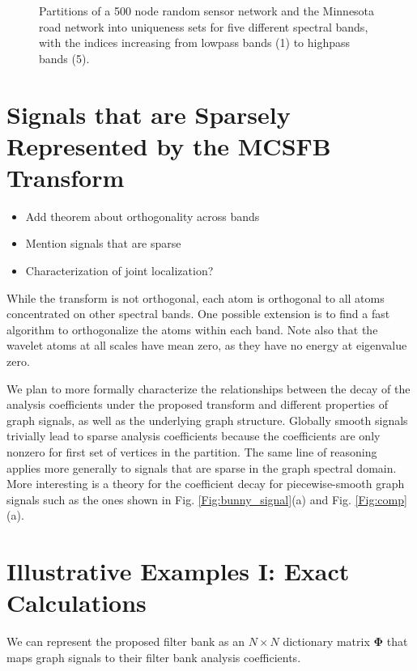 \documentclass[journal, 10pt]{IEEEtran}
\begin{document}
\begin{figure}[tb]
\begin{minipage}[m]{0.46\linewidth}
\end{minipage}
\caption{Partitions of a 500 node random sensor network and the Minnesota road network \cite{gleich} into uniqueness sets for five different spectral bands, with the indices increasing from lowpass bands (1) to highpass bands (5).} \label{Fig:part_examples}
\end{figure} 

{\color{red}
\section{Signals that are Sparsely Represented by the MCSFB Transform}
\begin{itemize}
\item Add theorem about orthogonality across bands
\item Mention signals that are sparse
\item Characterization of joint localization?
\end{itemize}

While the transform is not orthogonal, each atom is orthogonal to all atoms concentrated on other spectral bands. One possible extension is to find a fast algorithm to orthogonalize the atoms within each band. Note also that the wavelet atoms at all scales have mean zero, as they have no energy at eigenvalue zero.


We  plan to more formally characterize the relationships between the decay of the analysis coefficients under the proposed transform and different properties of graph signals, as well as the underlying graph structure.
Globally smooth signals trivially lead to sparse analysis coefficients because the coefficients are only nonzero for first set of vertices in the partition. The same line of reasoning applies more generally to signals that are sparse in the graph spectral domain. More interesting is a theory for the coefficient decay for piecewise-smooth graph signals such as the ones shown in Fig. \ref{Fig:bunny_signal}(a) and Fig. \ref{Fig:comp}(a).

}

\section{Illustrative Examples I: Exact Calculations}
We can represent the proposed filter bank as an $N \times N$ dictionary matrix $\boldsymbol{\Phi}$ that maps graph signals to their filter bank analysis coefficients. 
\end{document}
